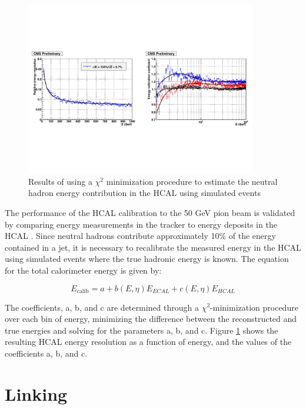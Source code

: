 \begin{figure}[h]
   \centering
  \includegraphics[width=0.9\textwidth]{Figures/Reconstruction_Diagrams/HCAL_calibration_chi2_fit_from_ecal.pdf}
  \caption{Results of using a $\chi^{2}$ minimization procedure to
    estimate the neutral hadron energy contribution in the HCAL using
    simulated events\cite{CMS-PAS-PFT-09-001}} \label{fig:hcal_calibration}
\end{figure}

\par The performance of the HCAL calibration to the 50 GeV pion beam is
validated by comparing energy measurements in the tracker to energy
deposits in the HCAL \cite{CMS-DP-2010-025}.  Since neutral hadrons
contribute approximately 10$\%$ of the energy contained in a jet, it is
necessary to recalibrate the measured energy in the HCAL using
simulated events where the true hadronic energy is known.  The
equation for the total calorimeter energy is given by:

\begin{equation}\label{eq:calorimeter_calibration}
E_{\text{calib}} = a + b(E, \eta)E_{ECAL} + c(E, \eta)E_{HCAL}
\end{equation} 

\noindent The coefficients, a, b, and c are determined through a
$\chi^{2}$-minimization procedure over each bin of energy, minimizing
the difference between the reconstructed and true energies and solving
for the parameters a, b, and c.  Figure \ref{fig:hcal_calibration}
shows the resulting HCAL energy resolution as a function of energy,
and the values of the coefficients a, b, and c.  


\section{Linking}
\label{linking_overview}

